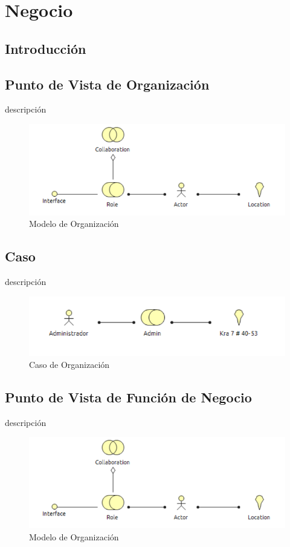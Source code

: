 \chapter{Negocio}
\section{Introducción}
\newpage

\section{Punto de Vista de Organización}
descripción


\begin{figure}[th!]
	\centering
	\includegraphics[width=0.7\linewidth]{arquitectura/negocio/imgs/m_organizacion}
	\caption{Modelo de Organización}
\end{figure}

\newpage
\section{Caso}
descripción

\begin{figure}[th!]
	\centering
	\includegraphics[width=0.7\linewidth]{arquitectura/negocio/imgs/c_organizacion}
	\caption{Caso de Organización}
\end{figure}
\newpage

\section{Punto de Vista de Función de Negocio}
descripción


\begin{figure}[th!]
	\centering
	\includegraphics[width=0.7\linewidth]{arquitectura/negocio/imgs/m_organizacion}
	\caption{Modelo de Organización}
\end{figure}

